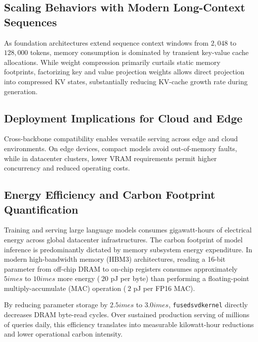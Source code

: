\subsection{Scaling Behaviors with Modern Long-Context Sequences}
As foundation architectures extend sequence context windows from $2{,}048$ to $128{,}000$ tokens, memory consumption is dominated by transient key-value cache allocations. While weight compression primarily curtails static memory footprints, factorizing key and value projection weights allows direct projection into compressed KV states, substantially reducing KV-cache growth rate during generation.

\subsection{Deployment Implications for Cloud and Edge}
Cross-backbone compatibility enables versatile serving across edge and cloud environments. On edge devices, compact models avoid out-of-memory faults, while in datacenter clusters, lower VRAM requirements permit higher concurrency and reduced operating costs.

\subsection{Energy Efficiency and Carbon Footprint Quantification}
Training and serving large language models consumes gigawatt-hours of electrical energy across global datacenter infrastructures. The carbon footprint of model inference is predominantly dictated by memory subsystem energy expenditure. In modern high-bandwidth memory (HBM3) architectures, reading a 16-bit parameter from off-chip DRAM to on-chip registers consumes approximately $5	imes$ to $10	imes$ more energy ($~20$ pJ per byte) than performing a floating-point multiply-accumulate (MAC) operation ($~2$ pJ per FP16 MAC).

By reducing parameter storage by $2.5	imes$ to $3.0	imes$, \texttt{fusedsvdkernel} directly decreases DRAM byte-read cycles. Over sustained production serving of millions of queries daily, this efficiency translates into measurable kilowatt-hour reductions and lower operational carbon intensity.
